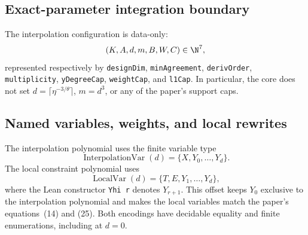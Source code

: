 \begin{definition}
  \label{def:hidden_derivative_filter_candidates}
  \notready
\end{definition}

\subsection{Exact-parameter integration boundary}

The interpolation configuration is data-only:
\[
  (K,A,d,m,B,W,C)\in\N^7,
\]
represented respectively by \texttt{designDim}, \texttt{minAgreement}, \texttt{derivOrder},
\texttt{multiplicity}, \texttt{yDegreeCap}, \texttt{weightCap}, and \texttt{l1Cap}.  In particular,
the core does not set $d=\lceil\eta^{-3/\theta}\rceil$, $m=d^3$, or any of the paper's support
caps.

\begin{definition}
  \label{def:hidden_derivative_parameters}
  \leanok
\end{definition}

\subsection{Named variables, weights, and local rewrites}

The interpolation polynomial uses the finite variable type
\[
  \operatorname{InterpolationVar}(d)=\{X,Y_0,\ldots,Y_d\}.
\]
The local constraint polynomial uses
\[
  \operatorname{LocalVar}(d)=\{T,E,Y_1,\ldots,Y_d\},
\]
where the Lean constructor \texttt{Yhi r} denotes $Y_{r+1}$.  This offset keeps $Y_0$ exclusive to
the interpolation polynomial and makes the local variables match the paper's equations~(14) and
(25).  Both encodings have decidable equality and finite enumerations, including at $d=0$.

\begin{definition}
  \label{def:hidden_derivative_interpolation_variables}
  \leanok
\end{definition}

\begin{definition}
  \label{def:hidden_derivative_local_variables}
  \leanok
\end{definition}

